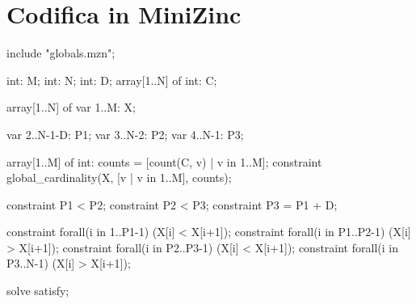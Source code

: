 \documentclass[12pt]{article}
\begin{document}
\section{Codifica in MiniZinc}

\begin{mznbox}{}
include "globals.mzn"; %

int: M;
int: N;
int: D;
array[1..N] of int: C;

array[1..N] of var 1..M: X;

var 2..N-1-D: P1; %
var 3..N-2: P2; %
var 4..N-1: P3; %

array[1..M] of int: counts = [count(C, v) | v in 1..M];
constraint global_cardinality(X, [v | v in 1..M], counts);


constraint P1 < P2;
constraint P2 < P3;
constraint P3 = P1 + D;

constraint forall(i in 1..P1-1) (X[i] < X[i+1]);
constraint forall(i in P1..P2-1) (X[i] > X[i+1]);
constraint forall(i in P2..P3-1) (X[i] < X[i+1]);
constraint forall(i in P3..N-1) (X[i] > X[i+1]);

solve satisfy;
\end{mznbox}
\end{document}
